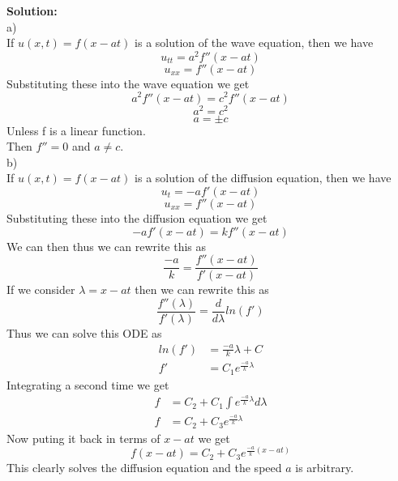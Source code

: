 \documentclass[answers,12pt,addpoints]{exam}
\begin{document}
\begin{questions}
    \textbf{Solution:}\\
    a)\\
    If $u(x,t) = f(x-at)$ is a solution of the wave equation, then we have
    $$ u_{tt} = a^2f''(x-at)$$
    $$ u_{xx} = f''(x-at)$$
    Substituting these into the wave equation we get
    $$ a^2f''(x-at) = c^2f''(x-at)$$
    $$ a^2 = c^2$$
    $$ a = \pm c$$
    Unless f is a linear function.\\ 
    Then $f'' = 0$ and $a \neq c$.\\
    b)\\
    If $u(x,t) = f(x-at)$ is a solution of the diffusion equation, then we have
    $$ u_t = -af'(x-at)$$
    $$ u_{xx} = f''(x-at)$$
    Substituting these into the diffusion equation we get
    $$ -af'(x-at) = kf''(x-at)$$
    We can then thus we can rewrite this as
    $$ \frac{-a}{k} = \frac{f''(x-at)}{f'(x-at)}$$
    If we consider $\lambda = x-at$ then we can rewrite this as
    $$ \frac{f''(\lambda)}{f'(\lambda)} = \frac{d}{d \lambda} ln(f')$$
    Thus we can solve this ODE as 
    \begin{align*}
    ln(f') &= \frac{-a}{k}\lambda + C\\
    f' &= C_1 e^{\frac{-a}{k}\lambda}
    \end{align*}
    Integrating a second time we get 
    \begin{align*}
    f &= C_2 + C_1 \int e^{\frac{-a}{k}\lambda} d\lambda\\
    f &= C_2 + C_3 e^{\frac{-a}{k}\lambda}
    \end{align*}
    Now puting it back in terms of $x-at$ we get
    $$ f(x-at) = C_2 + C_3 e^{\frac{-a}{k}(x-at)}$$
    This clearly solves the diffusion equation and the speed $a$ is arbitrary.\\


\end{questions}
\end{document}
